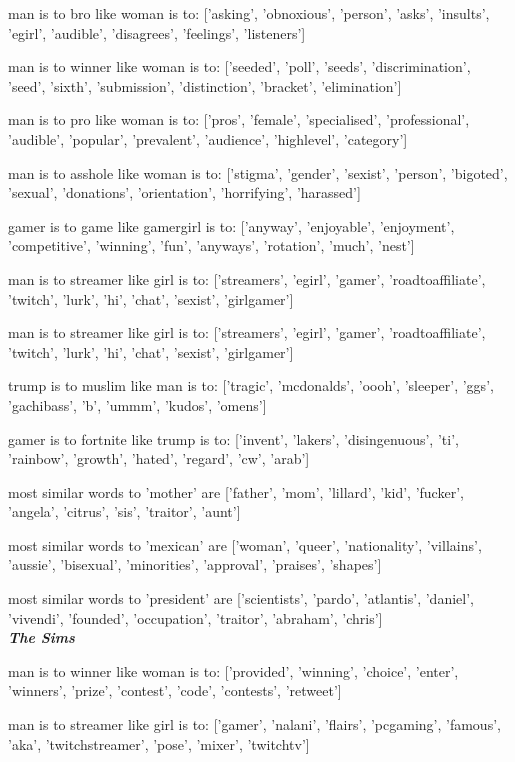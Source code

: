 man is to bro like woman is to: ['asking', 'obnoxious', 'person', 'asks', 'insults', 'egirl', 'audible', 'disagrees', 'feelings', 'listeners']

man is to winner like woman is to: ['seeded', 'poll', 'seeds', 'discrimination', 'seed', 'sixth', 'submission', 'distinction', 'bracket', 'elimination']

man is to pro like woman is to: ['pros', 'female', 'specialised', 'professional', 'audible', 'popular', 'prevalent', 'audience', 'highlevel', 'category']

man is to asshole like woman is to: ['stigma', 'gender', 'sexist', 'person', 'bigoted', 'sexual', 'donations', 'orientation', 'horrifying', 'harassed']

gamer is to game like gamergirl is to: ['anyway', 'enjoyable', 'enjoyment', 'competitive', 'winning', 'fun', 'anyways', 'rotation', 'much', 'nest']

man is to streamer like girl is to: ['streamers', 'egirl', 'gamer', 'roadtoaffiliate', 'twitch', 'lurk', 'hi', 'chat', 'sexist', 'girlgamer']

man is to streamer like girl is to: ['streamers', 'egirl', 'gamer', 'roadtoaffiliate', 'twitch', 'lurk', 'hi', 'chat', 'sexist', 'girlgamer']

trump is to muslim like man is to: ['tragic', 'mcdonalds', 'oooh', 'sleeper', 'ggs', 'gachibass', 'b', 'ummm', 'kudos', 'omens']

gamer is to fortnite like trump is to: ['invent', 'lakers', 'disingenuous', 'ti', 'rainbow', 'growth', 'hated', 'regard', 'cw', 'arab']

most similar words to 'mother' are ['father', 'mom', 'lillard', 'kid', 'fucker', 'angela', 'citrus', 'sis', 'traitor', 'aunt']

most similar words to 'mexican' are ['woman', 'queer', 'nationality', 'villains', 'aussie', 'bisexual', 'minorities', 'approval', 'praises', 'shapes']

most similar words to 'president' are ['scientists', 'pardo', 'atlantis', 'daniel', 'vivendi', 'founded', 'occupation', 'traitor', 'abraham', 'chris']\\




\textbf{\emph{The Sims}}

man is to winner like woman is to: ['provided', 'winning', 'choice', 'enter', 'winners', 'prize', 'contest', 'code', 'contests', 'retweet']

man is to streamer like girl is to: ['gamer', 'nalani', 'flairs', 'pcgaming', 'famous', 'aka', 'twitchstreamer', 'pose', 'mixer', 'twitchtv']


